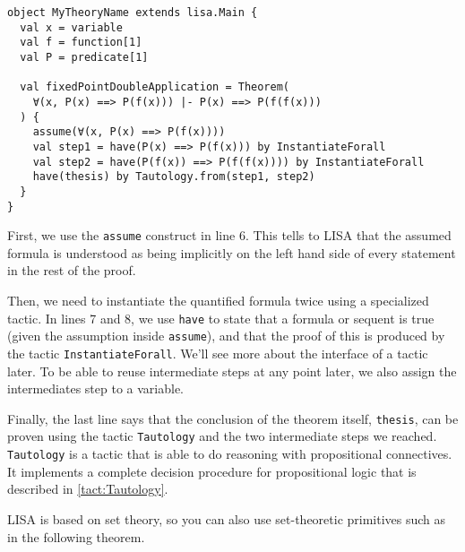 \noindent\begin{minipage}{\linewidth}\vspace{1em}
\begin{lstlisting}[language=lisa, frame=single]
object MyTheoryName extends lisa.Main {
  val x = variable
  val f = function[1]
  val P = predicate[1]

  val fixedPointDoubleApplication = Theorem( 
    ∀(x, P(x) ==> P(f(x))) |- P(x) ==> P(f(f(x)))
  ) {
    assume(∀(x, P(x) ==> P(f(x))))
    val step1 = have(P(x) ==> P(f(x))) by InstantiateForall
    val step2 = have(P(f(x)) ==> P(f(f(x)))) by InstantiateForall
    have(thesis) by Tautology.from(step1, step2)
  } 
}
\end{lstlisting}
\end{minipage}
First, we use the \lstinline|assume| construct in line 6.
This tells to LISA that the assumed formula is understood as being implicitly on the left hand side of every statement in the rest of the proof. 

Then, we need to instantiate the quantified formula twice using a specialized tactic. In lines 7 and 8, we use \lstinline|have| to state that a formula or sequent is true (given the assumption inside \lstinline|assume|), and that the proof of this is produced by the tactic \lstinline|InstantiateForall|.
We'll see more about the interface of a tactic later. To be able to reuse intermediate steps at any point later, we also assign the intermediates step to a variable.

Finally, the last line says that the conclusion of the theorem itself, \lstinline|thesis|, can be proven using the tactic \lstinline|Tautology| and the two intermediate steps we reached. \lstinline|Tautology| is a tactic that is able to do reasoning with propositional connectives. It implements a complete decision procedure for propositional logic that is described in \autoref{tact:Tautology}.

LISA is based on set theory, so you can also use set-theoretic primitives such as in the following theorem.

